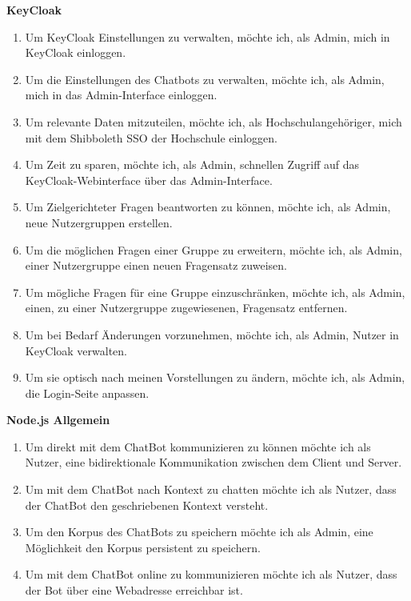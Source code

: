 \textbf{KeyCloak}
\begin{enumerate}
    \item Um KeyCloak Einstellungen zu verwalten, möchte ich, als Admin, mich in KeyCloak einloggen.
    \item Um die Einstellungen des Chatbots zu verwalten, möchte ich, als Admin, mich in das Admin-Interface einloggen.
    \item Um relevante Daten mitzuteilen, möchte ich, als Hochschulangehöriger, mich mit dem Shibboleth SSO der Hochschule einloggen.
    \item Um Zeit zu sparen, möchte ich, als Admin, schnellen Zugriff auf das KeyCloak-Webinterface über das Admin-Interface.
    \item Um Zielgerichteter Fragen beantworten zu können, möchte ich, als Admin, neue Nutzergruppen erstellen.
    \item Um die möglichen Fragen einer Gruppe zu erweitern, möchte ich, als Admin, einer Nutzergruppe einen neuen Fragensatz zuweisen.
    \item Um mögliche Fragen für eine Gruppe einzuschränken, möchte ich, als Admin, einen, zu einer Nutzergruppe zugewiesenen, Fragensatz entfernen.
    \item Um bei Bedarf Änderungen vorzunehmen, möchte ich, als Admin, Nutzer in KeyCloak verwalten.
    \item Um sie optisch nach meinen Vorstellungen zu ändern, möchte ich, als Admin, die Login-Seite anpassen.
\end{enumerate}

\textbf{Node.js Allgemein}
\begin{enumerate}
    \item Um direkt mit dem ChatBot kommunizieren zu können möchte ich als Nutzer, eine bidirektionale Kommunikation zwischen dem Client und Server.
    \item Um mit dem ChatBot nach Kontext zu chatten möchte ich als Nutzer, dass der ChatBot den geschriebenen Kontext versteht.
    \item Um den Korpus des ChatBots zu speichern möchte ich als Admin, eine Möglichkeit den Korpus persistent zu speichern.
    \item Um mit dem ChatBot online zu kommunizieren möchte ich als Nutzer, dass der Bot über eine Webadresse erreichbar ist.
\end{enumerate}

